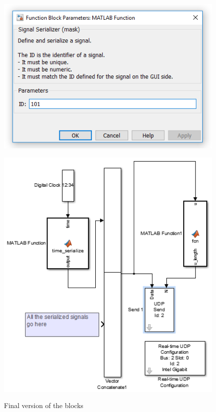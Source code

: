 \begin{figure}[H]
	\centering
	\begin{minipage}{.49\textwidth}
		\centering
		\includegraphics[width=\linewidth]{implementation/popupfinal}
		\label{fig:finalpopup}
	\end{minipage}
	\begin{minipage}{.49\textwidth}
		\centering
		\includegraphics[width=\linewidth]{implementation/UDPPacketfinal3}
		\label{fig:finaludpsys}
	\end{minipage}
	\caption{Final version of the blocks}
	\label{fig:finalimplementation}
\end{figure}
